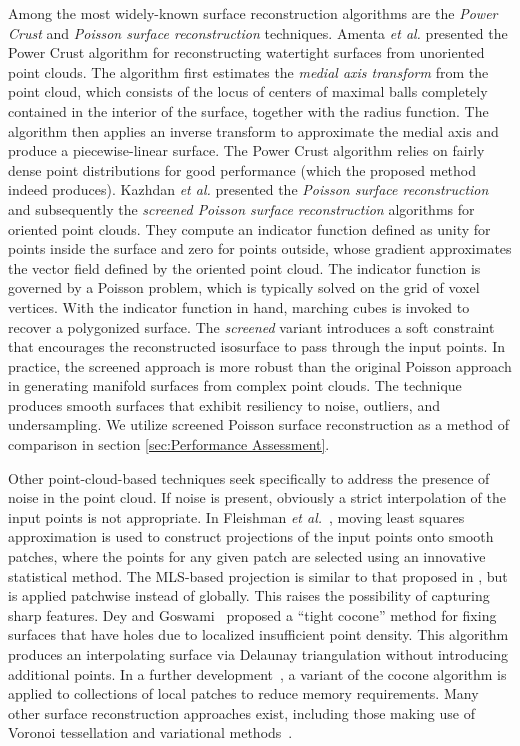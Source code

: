 Among the most widely-known surface reconstruction algorithms are the \textit{Power Crust} and \textit{Poisson surface reconstruction} techniques. Amenta \textit{et al.} \cite{amenta_2001} presented the Power Crust algorithm for reconstructing watertight surfaces from unoriented point clouds. The algorithm first estimates the \textit{medial axis transform} from the point cloud, which consists of the locus of centers of maximal balls completely contained in the interior of the surface, together with the radius function. The algorithm then applies an inverse transform to approximate the medial axis and produce a piecewise-linear surface. The Power Crust algorithm relies on fairly dense point distributions for good performance (which the proposed method indeed produces). Kazhdan \textit{et al.} presented the \textit{Poisson surface reconstruction} \cite{kazhdan_2008} and subsequently the \textit{screened Poisson surface reconstruction} \cite{kazhdan_2013} algorithms for oriented point clouds. They compute an indicator function defined as unity for points inside the surface and zero for points outside, whose gradient approximates the vector field defined by the oriented point cloud. The indicator function is governed by a Poisson problem, which is typically solved on the grid of voxel vertices.  With the indicator function in hand, marching cubes is invoked to recover a polygonized surface.  The \textit{screened} variant introduces a soft constraint that encourages the reconstructed isosurface to pass through the input points. In practice, the screened approach is more robust than the original Poisson approach in generating manifold surfaces from complex point clouds. The technique produces smooth surfaces that exhibit resiliency to noise, outliers, and undersampling. We utilize screened Poisson surface reconstruction as a method of comparison in section \ref{sec:Performance Assessment}.

Other point-cloud-based techniques seek specifically to address the presence of noise in the point cloud.  If noise is present, obviously a strict interpolation of the input points is not appropriate.  In Fleishman \textit{et al.}~\cite{fleishman2005}, moving least squares approximation is used to construct projections of the input points onto smooth patches, where the points for any given patch are selected using an innovative statistical method.  The MLS-based projection is similar to that proposed in \cite{levin2004}, but is applied patchwise instead of globally.  This raises the possibility of capturing sharp features. Dey and Goswami~\cite{dey2003} proposed a ``tight cocone'' method for fixing surfaces that have holes due to localized insufficient point density.  This algorithm produces an interpolating surface via Delaunay triangulation without introducing additional points.  In a further development~\cite{dey2011}, a variant of the cocone algorithm is applied to collections of local patches to reduce memory requirements.  Many other surface reconstruction approaches exist, including those making use of Voronoi tessellation and variational methods~\cite{berger}.

